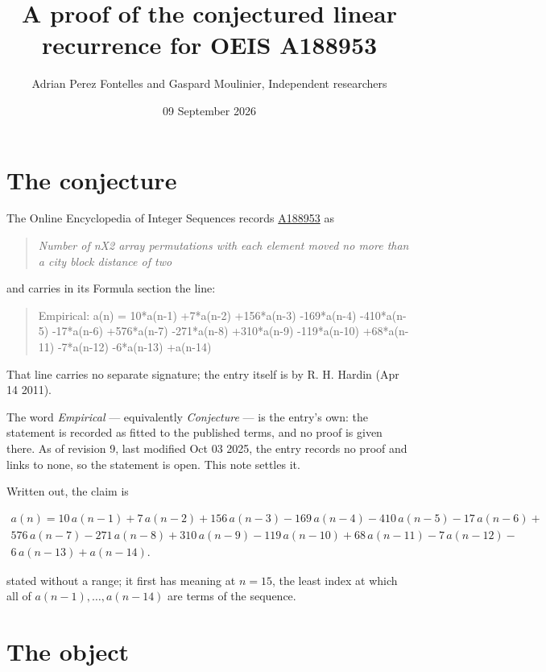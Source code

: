 \documentclass[11pt]{article}
\title{A proof of the conjectured linear recurrence for OEIS A188953}
\author{Adrian Perez Fontelles and Gaspard Moulinier, Independent researchers}
\date{09 September 2026}
\theoremstyle{definition}
\begin{document}
\maketitle
\section{The conjecture}

The Online Encyclopedia of Integer Sequences records \href{https://oeis.org/A188953}{A188953} as

\begin{quote}\itshape Number of nX2 array permutations with each element moved no more than a city block distance of two\end{quote}

and carries in its Formula section the line:

\begin{quote}\ttfamily Empirical: a(n) = 10*a(n-1) +7*a(n-2) +156*a(n-3) -169*a(n-4) -410*a(n-5) -17*a(n-6) +576*a(n-7) -271*a(n-8) +310*a(n-9) -119*a(n-10) +68*a(n-11) -7*a(n-12) -6*a(n-13) +a(n-14)\end{quote}

That line carries no separate signature; the entry itself is by R. H. Hardin (Apr 14 2011).

The word {\itshape Empirical} --- equivalently {\itshape Conjecture} --- is the entry's own: the statement is recorded as fitted to the published terms, and no proof is given there. As of revision 9, last modified Oct 03 2025, the entry records no proof and links to none, so the statement is open. This note settles it.

Written out, the claim is

\begin{multline*} a(n) = 10\,a(n-1) + 7\,a(n-2) + 156\,a(n-3) - 169\,a(n-4) - 410\,a(n-5) - 17\,a(n-6) + \\ 576\,a(n-7) - 271\,a(n-8) + 310\,a(n-9) - 119\,a(n-10) + 68\,a(n-11) - 7\,a(n-12) - \\ 6\,a(n-13) + a(n-14). \end{multline*}

stated without a range; it first has meaning at $n = 15$, the least index at which all of $a(n-1),\dots,a(n-14)$ are terms of the sequence.

\section{The object}
\end{document}
